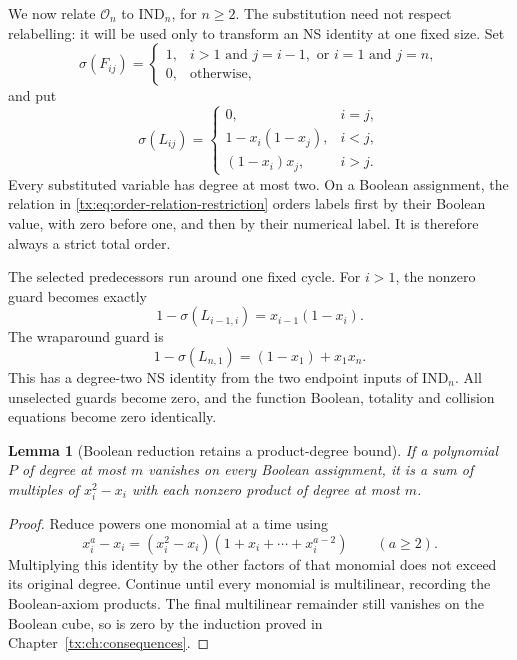\documentclass[11pt,a4paper,oneside,openany]{book}
\newtheorem{lemma}[theorem]{Lemma}
\theoremstyle{definition}\newtheorem{definition}[theorem]{Definition}
\theoremstyle{remark}\newtheorem{remark}[theorem]{Remark}
\numberwithin{equation}{chapter}
\begin{document}
We now relate $\mathcal O_n$ to $\mathrm{IND}_n$, for $n\ge2$.
The substitution need not respect relabelling: it will be used only
to transform an NS identity at one fixed size. Set
\begin{equation}\label{tx:eq:order-cycle-restriction}
 \sigma(F_{ij})=
 \begin{cases}
 1,&i>1\text{ and }j=i-1,\text{ or }i=1\text{ and }j=n,\\
 0,&\text{otherwise},
 \end{cases}
\end{equation}
and put
\begin{equation}\label{tx:eq:order-relation-restriction}
 \sigma(L_{ij})=
 \begin{cases}
 0,&i=j,\\
 1-x_i(1-x_j),&i<j,\\
 (1-x_i)x_j,&i>j.
 \end{cases}
\end{equation}
Every substituted variable has degree at most two. On a Boolean
assignment, the relation in \eqref{tx:eq:order-relation-restriction}
orders labels first by their Boolean value, with zero before one,
and then by their numerical label. It is therefore always a strict
total order.

The selected predecessors run around one fixed cycle. For $i>1$,
the nonzero guard becomes exactly
\[
            1-\sigma(L_{i-1,i})=x_{i-1}(1-x_i).
\]
The wraparound guard is
\begin{equation}\label{tx:eq:order-wrap-guard}
       1-\sigma(L_{n,1})=(1-x_1)+x_1x_n.
\end{equation}
This has a degree-two NS identity from the two endpoint inputs of
$\mathrm{IND}_n$. All unselected guards become zero, and the function
Boolean, totality and collision equations become zero identically.

\begin{lemma}[Boolean reduction retains a product-degree bound]
\label{tx:lem:order-Boolean-reduction}
If a polynomial $P$ of degree at most $m$ vanishes on every Boolean
assignment, it is a sum of multiples of $x_i^2-x_i$ with each nonzero
product of degree at most $m$.
\end{lemma}
\begin{proof}
Reduce powers one monomial at a time using
\[
 x_i^a-x_i=(x_i^2-x_i)(1+x_i+\cdots+x_i^{a-2})\qquad(a\ge2).
\]
Multiplying this identity by the other factors of that monomial
does not exceed its original degree. Continue until every monomial
is multilinear, recording the Boolean-axiom products. The final
multilinear remainder still vanishes on the Boolean cube, so is zero
by the induction proved in Chapter~\ref{tx:ch:consequences}.
\end{proof}
\end{document}
